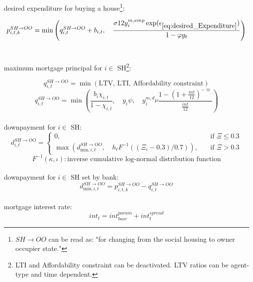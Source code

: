 \documentclass[]{article}
\begin{document}
\begin{flushleft}
	desired expenditure for buying a house\footnote{$SH\rightarrow OO$ can be read as: "for changing from the social housing to owner occupier state."}:
\end{flushleft}
\begin{equation} \label{eq:desired_Expenditure}
p^{SH \rightarrow OO}_{i,t,k} = \min\left(q^{SH\rightarrow OO}_{i,t}+b_{i,t},\quad  \dfrac{\sigma 12y^{m, emp}_{i} \exp(\epsilon_{\eqref{eq:desired_Expenditure}})}{1 - \varphi g_{t}}\right)
\end{equation}
\\
\begin{flushleft}
	maximum mortgage principal for $i \in$ SH\footnote{LTI and Affordability constraint can be deactivated. LTV ratios can be agent-type and time dependent.}:
\end{flushleft}
\begin{equation*}
q^{SH\rightarrow OO}_{i,t} =\min (\text{LTV, LTI, Affordability constraint})
\end{equation*}
\begin{equation} \label{eq:max_loan_principal}
q^{SH\rightarrow OO}_{i,t} = \min \left(\dfrac{b_{i}\chi_{i,t}}{1-\chi_{i,t}}, \quad y_{i}\psi, \quad y^{m,d}_{i}\nu
\dfrac{1-(1+\frac{int}{12})^{-\varpi}}{\frac{int}{12}} \right)
\end{equation}
\\
downpayment for $i \in$ SH:
\begin{equation} \label{eq:downpayment_SH}
d^{SH\rightarrow OO}_{i,t} = 
\begin{cases}
0, &\quad \text{if }  \Xi \leq 0.3\\
\max \left(d^{SH\rightarrow OO}_{\text{min},i,t}, \quad h_{t} F^{-1}((\Xi_{i} - 0.3)/0.7)\right), &\quad \text{if } \Xi>0.3  
\end{cases}
\end{equation}
\begin{equation*}
F^{-1}(\kappa, \iota): \text{inverse cumulative log-normal distribution function}
\end{equation*}
\\
downpayment for $i \in$ SH set by bank:
\begin{equation} \label{eq:min_d_SH}
d^{SH\rightarrow OO}_{\text{min},i,t}=p^{SH\rightarrow OO}_{i,t,k}-q^{SH\rightarrow OO}_{i,t}
\end{equation}
\\
mortgage interest rate:
\begin{equation} \label{eq:interest_rate}
int_{t} = int^{param}_{base} + int^{spread}_{t}
\end{equation}
\end{document}
